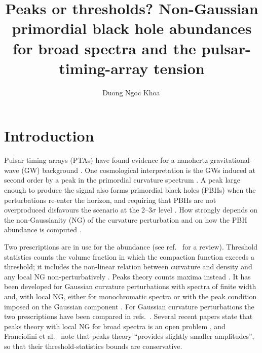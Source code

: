 \documentclass[a4paper,11pt]{article}
\title{Peaks or thresholds? Non-Gaussian primordial black hole abundances for broad spectra and
the pulsar-timing-array tension}
\author{Duong Ngoc Khoa\,\orcidlink{0009-0009-9409-3298}}
\affiliation{Phenikaa Institute for Advanced Study, Phenikaa University, Hanoi, Vietnam}
\begin{document}
\maketitle
\flushbottom

\section{Introduction}\label{sec:intro}

Pulsar timing arrays (PTAs) have found evidence for a nanohertz gravitational-wave (GW)
background \cite{NG15gwb,EPTA23,PPTA23,CPTA23}. One cosmological interpretation is the GWs
induced at second order by a peak in the primordial curvature spectrum
\cite{Ananda,Baumann,Kohri,Domenech,NG15np,FPRS23,Ellis23}. A peak large enough to produce the
signal also forms primordial black holes (PBHs) when the perturbations re-enter the horizon, and
requiring that PBHs are not overproduced disfavours the scenario at the 2--3$\sigma$ level
\cite{FIVT23,NG15np,Iovino24}. How strongly depends on the non-Gaussianity (NG) of the curvature
perturbation \cite{FIVT23,LCH23,WZLZ23} and on how the PBH abundance is computed \cite{Iovino24}.

Two prescriptions are in use for the abundance (see ref.~\cite{CIPVV26} for a review). Threshold
statistics counts the volume fraction in which the compaction function \cite{SS99,Harada15}
exceeds a threshold; it includes the non-linear relation between curvature and density
\cite{Young19,DeLuca19} and any local NG non-perturbatively \cite{Ferrante,Ianniccari}. Peaks
theory counts maxima instead \cite{BBKS,Yoo18}. It has been developed for Gaussian curvature
perturbations with spectra of finite width \cite{Yoo20,GS20,Pi25,Kushwaha,ColeFumagalli} and, with
local NG, either for monochromatic spectra \cite{Young22,Kitajima,Inui} or with the peak condition
imposed on the Gaussian component \cite{AGM19,YGY19,Riccardi}. For Gaussian curvature
perturbations the two prescriptions have been compared in refs.~\cite{Gow21,Ianniccari,Kushwaha,Iovino24}.
Several recent papers state that peaks theory with local NG for broad spectra is an open problem
\cite{Ianniccari,Iovino24,IPV25,Pi25,ColeFumagalli,GTV25}, and Franciolini et al.~\cite{FIVT23}
note that peaks theory ``provides slightly smaller amplitudes'', so that their threshold-statistics
bounds are conservative.
\end{document}
